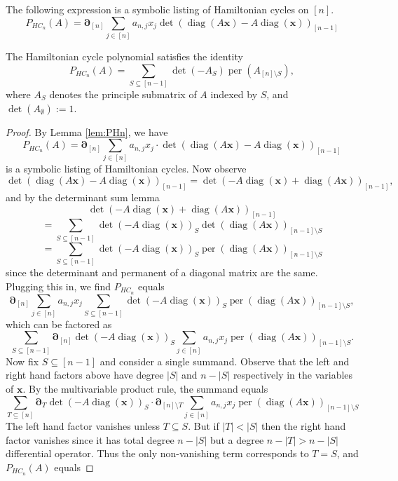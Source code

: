 \documentclass[10pt,a4paper]{amsart}
\newcommand{\diag}{\operatorname{diag}}
\newcommand{\per}{\operatorname{per}}
\begin{document}
\begin{lem}\label{lem:PHn}
    The following expression is a symbolic listing of Hamiltonian cycles on $[n]$.
    \[
        P_{HC_n}(A)=\boldsymbol{\partial}_{[n]}\sum_{j\in[n]}a_{n,j}x_j\det(\diag(A\boldsymbol{x})-A\diag(\boldsymbol{x}))_{[n-1]}
    \]
\end{lem}

\begin{thm*}
    The Hamiltonian cycle polynomial satisfies the identity
    \[
        P_{HC_n}(A)=\sum_{S\subseteq [n-1]}\det(-A_S)\per(A_{[n]\setminus S}),
    \]
    where $A_S$ denotes the principle submatrix of $A$ indexed by $S$, and $\det(A_{\emptyset}):=1$.
\end{thm*}

\begin{proof}
    By Lemma \ref{lem:PHn}, we have
    \[
        P_{HC_n}(A)=\boldsymbol{\partial}_{[n]}\sum_{j\in[n]}a_{n,j}x_j\cdot\det(\diag(A\boldsymbol{x})-A\diag(\boldsymbol{x}))_{[n-1]}
    \]
    is a symbolic listing of Hamiltonian cycles. Now observe
    \[
        \det(\diag(A\boldsymbol{x})-A\diag(\boldsymbol{x}))_{[n-1]}=\det(-A\diag(\boldsymbol{x}) + \diag(A\boldsymbol{x}))_{[n-1]},
    \]
    and by the determinant sum lemma
    \[
        \det(-A\diag(\boldsymbol{x}) + \diag(A\boldsymbol{x}))_{[n-1]}
    \]
    \[
        =\sum_{S\subseteq[n-1]}\det(-A\diag(\boldsymbol{x}))_S\det(\diag(A\boldsymbol{x}))_{[n-1]\setminus S}
    \]
    \[
        =\sum_{S\subseteq[n-1]}\det(-A\diag(\boldsymbol{x}))_S\per(\diag(A\boldsymbol{x}))_{[n-1]\setminus S}
    \]
    since the determinant and permanent of a diagonal matrix are the same. Plugging this in, we find $P_{HC_n}$ equals
    \[
        \boldsymbol{\partial}_{[n]}\sum_{j\in[n]}a_{n,j}x_j\sum_{S\subseteq[n-1]}\det(-A\diag(\boldsymbol{x}))_S\per(\diag(A\boldsymbol{x}))_{[n-1]\setminus S},
    \]
    which can be factored as
    \[
        \sum_{S\subseteq[n-1]}\boldsymbol{\partial}_{[n]}\det(-A\diag(\boldsymbol{x}))_S\sum_{j\in[n]}a_{n,j}x_j\per(\diag(A\boldsymbol{x}))_{[n-1]\setminus S}.
    \]
    Now fix $S\subseteq[n-1]$ and consider a single summand. Observe that the left and right hand factors above have degree $|S|$ and $n-|S|$ respectively in the variables of $\boldsymbol{x}$. By the multivariable product rule, the summand equals
    \[
        \sum_{T\subseteq[n]}\boldsymbol{\partial}_{T}\det(-A\diag(\boldsymbol{x}))_S
        \cdot\boldsymbol{\partial}_{[n]\setminus T}\sum_{j\in[n]}a_{n,j}x_j\per(\diag(A\boldsymbol{x}))_{[n-1]\setminus S}
    \]
    The left hand factor vanishes unless $T\subseteq S$. But if $|T|<|S|$ then the right hand factor vanishes since it has total degree $n-|S|$ but a degree $n-|T|>n-|S|$ differential operator. Thus the only non-vanishing term corresponds to $T=S$, and $P_{HC_n}(A)$ equals

\end{proof}
\end{document}
